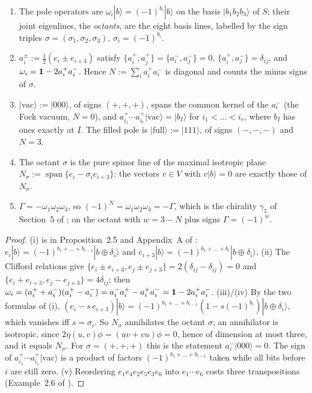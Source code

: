 \begin{proposition}
\label{r3:prop:octants}
\begin{enumerate}[label=(\roman*),leftmargin=2.2em]
\item The pole operators are $\omega_i|b\rangle=(-1)^{b_i}|b\rangle$ on the basis $|b_1b_2b_3\rangle$ of $S$; their joint eigenlines, the
\emph{octants}, are the eight basis lines, labelled by the sign triples $\sigma=(\sigma_1,\sigma_2,\sigma_3)$, $\sigma_i=(-1)^{b_i}$.
\item $a^\pm_i:=\tfrac12(e_i\pm e_{i+3})$ satisfy $\{a^+_i,a^+_j\}=\{a^-_i,a^-_j\}=0$, $\{a^+_i,a^-_j\}=\delta_{ij}$, and
$\omega_i=\mathbf 1-2a^+_ia^-_i$. Hence $N:=\sum_ia^+_ia^-_i$ is diagonal and counts the minus signs of $\sigma$.
\item $|\mathrm{vac}\rangle:=|000\rangle$, of signs $(+,+,+)$, spans the common kernel of the $a^-_i$ (the Fock vacuum, $N=0$), and
$a^+_{i_1}\cdots a^+_{i_r}|\mathrm{vac}\rangle=|b_I\rangle$ for $i_1<\dots<i_r$, where $b_I$ has ones exactly at $I$. The filled pole is
$|\mathrm{full}\rangle:=|111\rangle$, of signs $(-,-,-)$ and $N=3$.
\item The octant $\sigma$ is the pure spinor line of the maximal isotropic plane $N_\sigma:=\operatorname{span}\{e_i-\sigma_ie_{i+3}\}$: the
vectors $v\in V$ with $v|b\rangle=0$ are exactly those of $N_\sigma$.
\item $\Gamma=-\omega_1\omega_2\omega_3$, so $(-1)^N=\omega_1\omega_2\omega_3=-\Gamma$, which is the chirality $\gamma_5$ of Section~5 of
\cite{ES17}; on the octant with $w=3-N$ plus signs $\Gamma=(-1)^w$.
\end{enumerate}
\end{proposition}

\begin{proof}
(i) is in Proposition~2.5 and Appendix~A of \cite{ES17}: $e_i|b\rangle=(-1)^{b_1+\dots+b_{i-1}}|b\oplus\delta_i\rangle$ and
$e_{i+3}|b\rangle=(-1)^{b_1+\dots+b_i}|b\oplus\delta_i\rangle$. (ii) The Clifford relations give $\{e_i\pm e_{i+3},e_j\pm e_{j+3}\}=2(\delta_{ij}-\delta_{ij})=0$
and $\{e_i+e_{i+3},e_j-e_{j+3}\}=4\delta_{ij}$; then $\omega_i=(a^+_i+a^-_i)(a^+_i-a^-_i)=a^-_ia^+_i-a^+_ia^-_i=\mathbf 1-2a^+_ia^-_i$. (iii)/(iv) By the two
formulas of (i), $(e_i-s\,e_{i+3})|b\rangle=(-1)^{b_1+\dots+b_{i-1}}(1-s(-1)^{b_i})|b\oplus\delta_i\rangle$, which vanishes iff $s=\sigma_i$. So $N_\sigma$
annihilates the octant $\sigma$; an annihilator is isotropic, since $2\eta(u,v)\phi=(uv+vu)\phi=0$, hence of dimension at most three, and it equals
$N_\sigma$. For $\sigma=(+,+,+)$ this is the statement $a^-_i|000\rangle=0$. The sign of $a^+_{i_1}\cdots a^+_{i_r}|\mathrm{vac}\rangle$ is a product of
factors $(-1)^{b_1+\dots+b_{i-1}}$ taken while all bits before $i$ are still zero. (v) Reordering $e_1e_4e_2e_5e_3e_6$ into $e_1\cdots e_6$
costs three transpositions (Example~2.6 of \cite{ES17}).
\end{proof}

